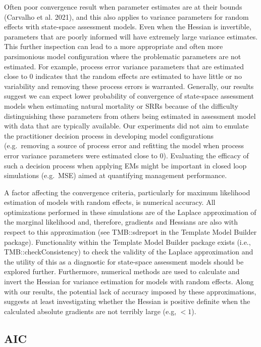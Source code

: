 \documentclass[
  12pt,
]{article}
\begin{document}
Often poor convergence result when parameter estimates are at their
bounds (Carvalho et al. 2021), and this also applies to variance
parameters for random effects with state-space assessment models. Even
when the Hessian is invertible, parameters that are poorly informed will
have extremely large variance estimates. This further inspection can
lead to a more appropriate and often more parsimonious model
configuration where the problematic parameters are not estimated. For
example, process error variance parameters that are estimated close to 0
indicates that the random effects are estimated to have little or no
variability and removing these process errors is warranted. Generally,
our results suggest we can expect lower probability of convergence of
state-space assessment models when estimating natural mortality or SRRs
because of the difficulty distinguishing these parameters from others
being estimated in assessment model with data that are typically
available. Our experiments did not aim to emulate the practitioner
decision process in developing model configurations (e.g.~removing a
source of process error and refitting the model when process error
variance parameters were estimated close to 0). Evaluating the efficacy
of such a decision process when applying EMs might be important in
closed loop simulations (e.g.~MSE) aimed at quantifying management
performance.

A factor affecting the convergence criteria, particularly for maximum
likelihood estimation of models with random effects, is numerical
accuracy. All optimizations performed in these simulations are of the
Laplace approximation of the marginal likelihood and, therefore,
gradients and Hessians are also with respect to this approximation (see
TMB::sdreport in the Template Model Builder package). Functionality
within the Template Model Builder package exists (i.e.,
TMB::checkConsistency) to check the validity of the Laplace
approximation and the utility of this as a diagnostic for state-space
assessment models should be explored further. Furthermore, numerical
methods are used to calculate and invert the Hessian for variance
estimation for models with random effects. Along with our results, the
potential lack of accuracy imposed by these approximations, suggests at
least investigating whether the Hessian is positive definite when the
calculated absolute gradients are not terribly large (e.g, \(< 1\)).

\hypertarget{aic}{%
\subsection*{AIC}\label{aic}}
\end{document}
